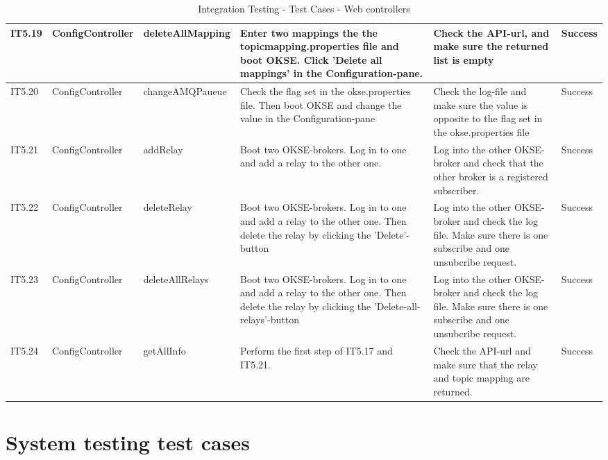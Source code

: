 \begin{table}[ht!]
\begin{tabular}{|m{0.5cm}|m{1.5cm}|m{1.5cm}|m{3cm}|m{3cm}|m{1.5cm}|}
IT5.19 & ConfigController & deleteAllMapping & Enter two mappings the the topicmapping.properties file and boot OKSE. Click 'Delete all mappings' in the Configuration-pane. & Check the API-url, and make sure the returned list is empty & Success \\ \hline
IT5.20 & ConfigController & changeAMQPaueue & Check the flag set in the okse.properties file. Then boot OKSE and change the value in the Configuration-pane & Check the log-file and make sure the value is opposite to the flag set in the okse.properties file & Success \\ \hline
IT5.21 & ConfigController & addRelay & Boot two OKSE-brokers. Log in to one and add a relay to the other one. & Log into the other OKSE-broker and check that the other broker is a registered subscriber. & Success \\ \hline
IT5.22 & ConfigController & deleteRelay & Boot two OKSE-brokers. Log in to one and add a relay to the other one. Then delete the relay by clicking the 'Delete'-button & Log into the other OKSE-broker and check the log file. Make sure there is one subscribe and one unsubcribe request. & Success \\ \hline
IT5.23 & ConfigController & deleteAllRelays & Boot two OKSE-brokers. Log in to one and add a relay to the other one. Then delete the relay by clicking the 'Delete-all-relays'-button & Log into the other OKSE-broker and check the log file. Make sure there is one subscribe and one unsubcribe request. & Success \\ \hline
IT5.24 & ConfigController & getAllInfo & Perform the first step of IT5.17 and IT5.21. & Check the API-url and make sure that the relay and topic mapping are returned. & Success \\ \hline
\end{tabular}
\caption{Integration Testing - Test Cases - Web controllers}
\label{table:integration-testing-cases-webcontroller}
\end{table}

\clearpage

\section{System testing test cases}
\label{appendix-c:system_test_cases}

